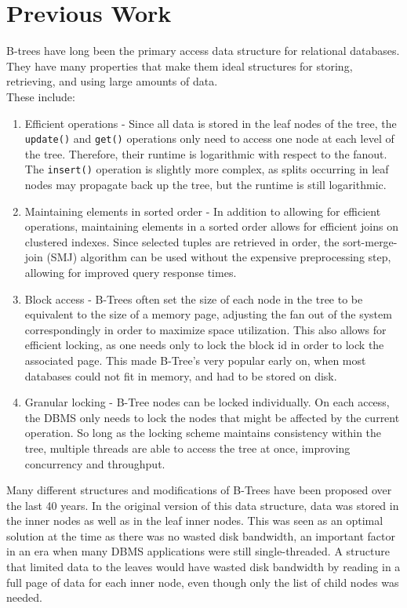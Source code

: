 \documentclass{sig-alternate}
\begin{document}
\section{Previous Work}
B-trees have long been the primary access data structure for  relational databases. They have many properties that make them ideal structures for storing, retrieving, and using large amounts of data.\\
These include:
\begin{enumerate}
\item Efficient operations - Since all data is stored in the leaf nodes of the tree, the \texttt{update()} and \texttt{get()} operations only need to access one node at each level of the tree. Therefore, their runtime is logarithmic with respect to the fanout. The \texttt{insert()} operation is slightly more complex, as splits occurring in leaf nodes may propagate back up the tree, but the runtime is still logarithmic.
\item Maintaining elements in sorted order - In addition to allowing for efficient operations, maintaining elements in a sorted order allows for efficient joins on clustered indexes. Since selected tuples are retrieved in order, the sort-merge-join (SMJ) algorithm can be used without the expensive preprocessing step, allowing for improved query response times.
\item Block access - B-Trees often set the size of each node in the tree to be equivalent to the size of a memory page, adjusting the fan out of the system correspondingly in order to maximize space utilization. This also allows for efficient locking, as one needs only to lock the block id in order to lock the associated page. This made B-Tree's very popular early on, when most databases could not fit in memory, and had to be stored on disk.
\item Granular locking - B-Tree nodes can be locked individually. On each access, the DBMS only needs to lock the nodes that might be affected by the current operation. So long as the locking scheme maintains consistency within the tree, multiple threads are able to access the tree at once, improving concurrency and throughput.
\end{enumerate}

Many different structures and modifications of B-Trees have been proposed over the last 40 years.  In the original version of this data structure, data was stored in the inner nodes as well as in the leaf inner nodes.  This was seen as an optimal solution at the time as there was no wasted disk bandwidth, an important factor in an era when many DBMS applications were still single-threaded. A structure that limited data to the leaves would have wasted disk bandwidth by reading in a full page of data for each inner node, even though only the list of child nodes was needed. 
\end{document}
